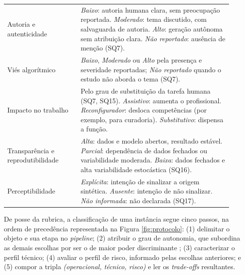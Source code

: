 \begin{longtable}{>{\raggedright\arraybackslash}p{0.30\linewidth} >{\raggedright\arraybackslash}p{0.62\linewidth}}
\hline
Autoria e autenticidade & \textit{Baixo}: autoria humana clara, sem preocupação reportada. \textit{Moderado}: tema discutido, com salvaguarda de autoria. \textit{Alto}: geração autônoma sem atribuição clara. \textit{Não reportado}: ausência de menção (SQ7). \\
Viés algorítmico & \textit{Baixo}, \textit{Moderado} ou \textit{Alto} pela presença e severidade reportadas; \textit{Não reportado} quando o estudo não aborda o tema (SQ7). \\
Impacto no trabalho & Pelo grau de substituição da tarefa humana (SQ7, SQ15). \textit{Assistivo}: aumenta o profissional. \textit{Reconfigurador}: desloca competências (por exemplo, para curadoria). \textit{Substitutivo}: dispensa a função. \\
Transparência e reprodutibilidade & \textit{Alta}: dados e modelo abertos, resultado estável. \textit{Parcial}: dependência de dados fechados ou variabilidade moderada. \textit{Baixa}: dados fechados e alta variabilidade estocástica (SQ16). \\
Perceptibilidade & \textit{Explícita}: intenção de sinalizar a origem sintética. \textit{Ausente}: intenção de não sinalizar. \textit{Não informada}: não declarada (SQ17). \\
\hline
\end{longtable}

De posse da rubrica, a classificação de uma instância segue cinco passos, na ordem de precedência representada na Figura \ref{fig:protocolo}: (1) delimitar o objeto e sua etapa no \textit{pipeline}; (2) atribuir o grau de autonomia, que subordina as demais escolhas por ser o de maior poder discriminante \citep{RothAleo2026}; (3) caracterizar o perfil técnico; (4) avaliar o perfil de risco, informado pelas escolhas anteriores; e (5) compor a tripla \textit{(operacional, técnico, risco)} e ler os \textit{trade-offs} resultantes.

